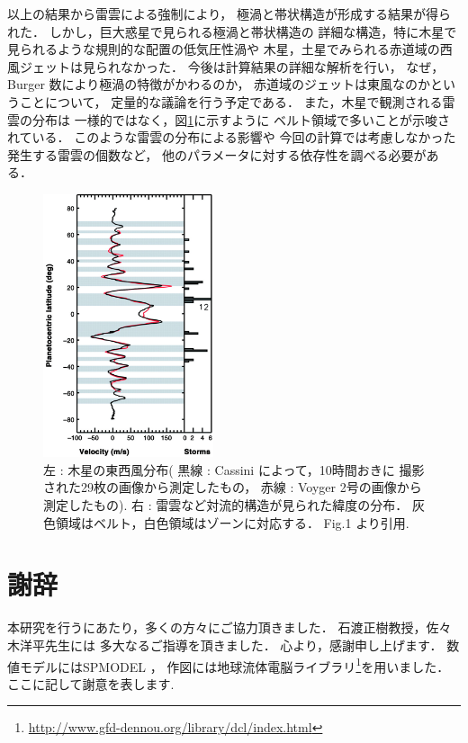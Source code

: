 \documentclass[a4j,12pt,openbib,oneside]{jreport}
\newcounter{chapcounter}
\newcounter{seccounter}
\begin{document}
以上の結果から雷雲による強制により，
極渦と帯状構造が形成する結果が得られた．
しかし，巨大惑星で見られる極渦と帯状構造の
詳細な構造，特に木星で見られるような規則的な配置の低気圧性渦や
木星，土星でみられる赤道域の西風ジェットは見られなかった．
%
今後は計算結果の詳細な解析を行い，
なぜ，Burger 数により極渦の特徴がかわるのか，
赤道域のジェットは東風なのかということについて，
定量的な議論を行う予定である．
%
また，木星で観測される雷雲の分布は
一様的ではなく，図\ref{fig:thunderstorm}に示すように
ベルト領域で多いことが示唆されている\citep{Porco2003}．
このような雷雲の分布による影響や
今回の計算では考慮しなかった
発生する雷雲の個数など，
他のパラメータに対する依存性を調べる必要がある．
\vspace{1zh}
\begin{figure}[ht]
  \begin{center}
    \includegraphics[clip,width=5cm]{./fig/conclusion/thunderstorm.jpg}
    \caption{
      \footnotesize{左 : 木星の東西風分布(
黒線 : Cassini によって，10時間おきに
撮影された29枚の画像から測定したもの，
赤線 : Voyger 2号の画像から測定したもの\citep{Limaye1986}).
右 : 雷雲など対流的構造が見られた緯度の分布．
灰色領域はベルト，白色領域はゾーンに対応する．
\cite{Porco2003} Fig.1 より引用.
      }
    }
    \label{fig:thunderstorm}
  \end{center}
\end{figure}
%
\def\acknow{謝辞}
\chapter*{\acknow}
\addcontentsline{toc}{chapter}{\acknow}
\label{acknow}
本研究を行うにあたり，多くの方々にご協力頂きました．
石渡正樹教授，佐々木洋平先生には
多大なるご指導を頂きました．
心より，感謝申し上げます．
数値モデルにはSPMODEL \citep{spmodel2006, spmodel2013}，
作図には地球流体電脳ライブラリ\footnote{\url{http://www.gfd-dennou.org/library/dcl/index.html}}を用いました．
ここに記して謝意を表します.
%
%
\end{document}

